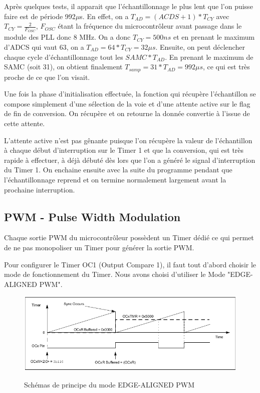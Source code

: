 \documentclass[11pt, french]{article} %
\begin{document}
Après quelques tests, il apparait que l'échantillonnage le plus lent que l'on puisse faire est de période 992$\mu$s. En effet, on a $T_{AD} = (ACDS+1) * T_{CY}$ avec $T_{CY} = \frac{2}{F_{OSC}}$, $F_{OSC}$ étant la fréquence du microcontrôleur avant passage dans le module des PLL donc 8 MHz. On a donc $T_{CY} = 500 ns$ et en prenant le maximum d'ADCS qui vaut 63, on a $T_{AD} = 64 * T_{CY} = 32 \mu s$. Ensuite, on peut déclencher chaque cycle d'échantillonnage tout les $SAMC * T_{AD}$. En prenant le maximum de SAMC (soit 31), on obtient finalement $T_{samp} = 31 * T_{AD} = 992 \mu s$, ce qui est très proche de ce que l'on visait.  

\vspace{0.5cm}

Une fois la phase d'initialisation effectuée, la fonction qui récupère l'échantillon se compose simplement d'une sélection de la voie et d'une attente active sur le flag de fin de conversion. On récupère et on retourne la donnée convertie à l'issue de cette attente. 

\vspace{0.5cm}

L'attente active n'est pas gênante puisque l'on récupère la valeur de l'échantillon à chaque début d'interruption sur le Timer 1 et que la conversion, qui est très rapide à effectuer, à déjà débuté dès lors que l'on a généré le signal d'interruption du Timer 1. On enchaine ensuite avec la suite du programme pendant que l'échantillonnage reprend et on termine normalement largement avant la prochaine interruption.

\vspace{0.5cm}


\subsection{PWM - Pulse Width Modulation}

Chaque sortie PWM du microcontrôleur possèdent un Timer dédié ce qui permet de ne pas monopoliser un Timer pour générer la sortie PWM.

Pour configurer le Timer OC1 (Output Compare 1), il faut tout d'abord choisir le mode de fonctionnement du Timer. Nous avons choisi d'utiliser le Mode "EDGE-ALIGNED PWM".

\begin{figure}[!h]
	\centering
	\includegraphics[width = 15cm]{SolutionAnalogique/PWMMode.png} 
	\label{pwm_mode}
	\caption{Schémas de principe du mode EDGE-ALIGNED PWM}
\end{figure}
\end{document}
